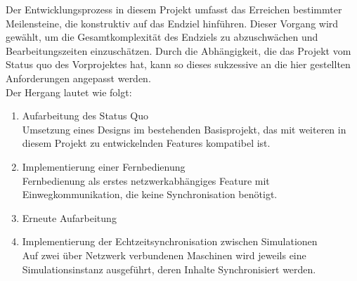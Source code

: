 Der Entwicklungsprozess in diesem Projekt umfasst das Erreichen bestimmter Meilensteine, die konstruktiv auf das Endziel hinführen. Dieser Vorgang wird gewählt, um die Gesamtkomplexität des Endziels zu abzuschwächen und Bearbeitungszeiten einzuschätzen. Durch die Abhängigkeit, die das Projekt vom Status quo des Vorprojektes hat, kann so dieses sukzessive an die hier gestellten Anforderungen angepasst werden.\\
Der Hergang lautet wie folgt:
\begin{enumerate}
\item Aufarbeitung des Status Quo\\
Umsetzung eines Designs im bestehenden Basisprojekt, das mit weiteren in diesem Projekt zu entwickelnden Features kompatibel ist.
\item Implementierung einer Fernbedienung\\
Fernbedienung als erstes netzwerkabhängiges Feature mit Einwegkommunikation, die keine Synchronisation benötigt.
\item Erneute Aufarbeitung
\item Implementierung der Echtzeitsynchronisation zwischen Simulationen\\
Auf zwei über Netzwerk verbundenen Maschinen wird jeweils eine Simulationsinstanz ausgeführt, deren Inhalte Synchronisiert werden.
\end{enumerate}

